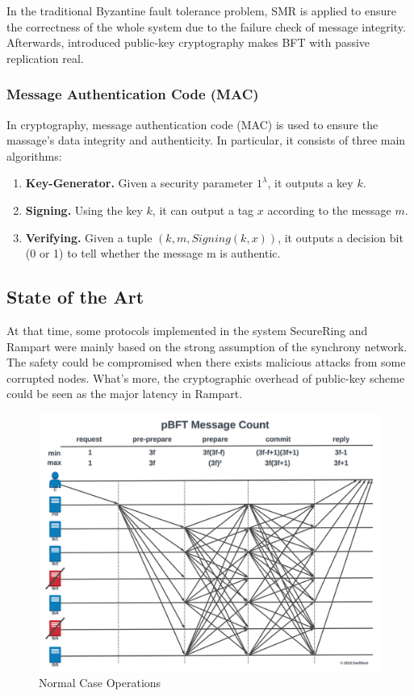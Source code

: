 \documentclass[conference]{IEEEtran}
\begin{document}
In the traditional Byzantine fault tolerance problem, SMR is applied to ensure the correctness of the whole system due to the failure check of message integrity.
%
Afterwards, introduced public-key cryptography makes BFT with passive replication real.

\subsubsection{Message Authentication Code (MAC)}
In cryptography, message authentication code (MAC) is used to ensure the massage's data integrity and authenticity.
%
In particular, it consists of three main algorithms:

\begin{enumerate}[label=(\roman*)]
    \item \textbf{Key-Generator.} Given a security parameter $1^{\lambda}$, it outputs a key $k$.
    \item \textbf{Signing.} Using the key $k$, it can output a tag $x$ according to the message $m$.
    \item \textbf{Verifying.} Given a tuple $(k, m, Signing(k, x))$, it outputs a decision bit (0 or 1) to tell whether the message m is authentic.
\end{enumerate}

\subsection{State of the Art}
At that time, some protocols implemented in the system SecureRing and Rampart were mainly based on the strong assumption of the synchrony network.
%
The safety could be compromised when there exists malicious attacks from some corrupted nodes.
%
What's more, the cryptographic overhead of public-key scheme could be seen as the major latency in Rampart. 

\begin{figure}[ht]
    \centering
    \includegraphics[width= 0.95\linewidth]{fig/PBFT.png}
    \caption{Normal Case Operations}
    \label{pbft}
\end{figure}
\end{document}

